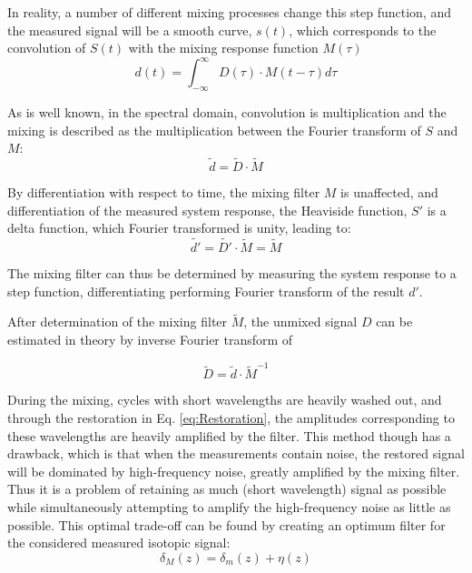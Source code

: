 \documentclass[../../CompleteThesis2/Complete_2ndDraft]{subfiles}
\begin{document}
In reality, a number of different mixing processes change this step function, and the measured signal will be a smooth curve, $s(t)$, which corresponds to the convolution of $S(t)$ with the mixing response function $M(\tau)$
\begin{equation}
	d(t) = \int_{- \infty}^{\infty} D(\tau) \cdot M(t - \tau)d\tau
\end{equation}

As is well known, in the spectral domain, convolution is multiplication and the mixing is described as the multiplication between the Fourier transform of $S$ and $M$:
\begin{equation}
	\tilde{d} = \tilde{D} \cdot \tilde{M}
\end{equation}


By differentiation with respect to time, the mixing filter $M$ is unaffected, and differentiation of the measured system response, the Heaviside function, $S'$ is a delta function, which Fourier transformed is unity, leading to:
\begin{equation}
	\tilde{d'} = \tilde{D'} \cdot \tilde{M} = \tilde{M}
\end{equation}

The mixing filter can thus be determined by measuring the system response to a step function, differentiating performing Fourier transform of the result $d'$.

After determination of the mixing filter $\tilde{M}$, the unmixed signal $D$ can be estimated in theory by inverse Fourier transform of


\begin{equation}
	\tilde{D} = \tilde{d}\cdot\tilde{M}^{-1}
	\label{eq:Restoration}
\end{equation}

During the mixing, cycles with short wavelengths are heavily washed out, and through the restoration in Eq. \ref{eq:Restoration}, the amplitudes corresponding to these wavelengths are heavily amplified by the filter. This method though has a drawback, which is that when the measurements contain noise, the restored signal will be dominated by high-frequency noise, greatly amplified by the mixing filter. Thus it is a problem of retaining as much (short wavelength) signal as possible while simultaneously attempting to amplify the high-frequency noise as little as possible. This optimal trade-off can be found by creating an optimum filter for the considered measured isotopic signal:
\begin{equation}
	\delta_M(z) = \delta_m (z) + \eta(z)
\end{equation} 
\end{document}
